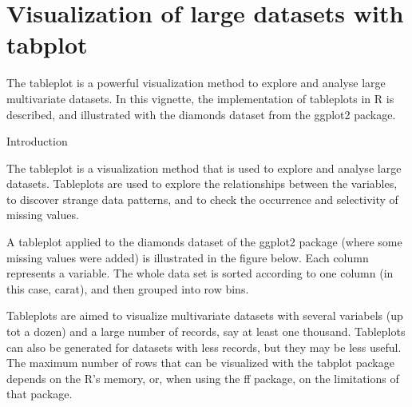 
\section*{Visualization of large datasets with tabplot}

The tableplot is a powerful visualization method to explore and analyse large multivariate datasets. In this vignette, the implementation of tableplots in R is described, and illustrated with the diamonds dataset from the ggplot2 package.

Introduction

The tableplot is a visualization method that is used to explore and analyse large datasets. Tableplots are used to explore the relationships between the variables, to discover strange data patterns, and to check the occurrence and selectivity of missing values.

A tableplot applied to the diamonds dataset of the ggplot2 package (where some missing values were added) is illustrated in the figure below. Each column represents a variable. The whole data set is sorted according to one column (in this case, carat), and then grouped into row bins.

Tableplots are aimed to visualize multivariate datasets with several variabels (up tot a dozen) and a large number of records, say at least one thousand. Tableplots can also be generated for datasets with less records, but they may be less useful. The maximum number of rows that can be visualized with the tabplot package depends on the R's memory, or, when using the ff package, on the limitations of that package.


